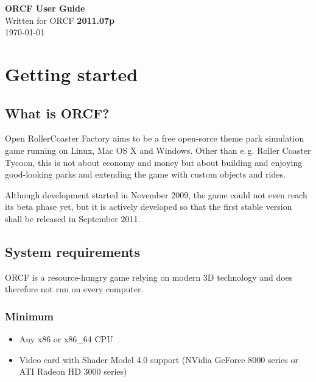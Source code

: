 \documentclass[a4paper]{article}
\begin{document}
\pagestyle{fancy}
\fancyhf{}
\fancyfoot[R]{\huge{\thepage}}

\vspace*{\fill}
\begin{center}
  \Huge{\textbf{ORCF User Guide}} \\
  \vspace{2cm}
  \large{Written for ORCF \textbf{2011.07p}} \\
  \vspace{1cm}
  \large{\today}
  \vspace{3cm}
\end{center}
\vfill

\newpage

\tableofcontents

\newpage

\section{Getting started}
\subsection{What is ORCF?}
Open RollerCoaster Factory aims to be a free open-sorce theme park simulation game running on Linux, Mac OS X and Windows. Other than e.\,g.
Roller Coaster Tycoon, this is not about economy and money but about building and enjoying good-looking parks and extending the game with
custom objects and rides.

Although development started in November 2009, the game could not even reach its beta phase yet, but it is actively developed so that the first
stable version shall be released in September 2011.


\subsection{System requirements}
ORCF is a resource-hungry game relying on modern 3D technology and does therefore not run on every computer.

\subsubsection{Minimum}
\begin{itemize}
  \item Any x86 or x86\_64 CPU
  \item Video card with Shader Model 4.0 support (NVidia GeForce 8000 series or ATI Radeon HD 3000 series)
\end{itemize}
\end{document}
